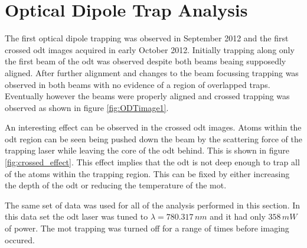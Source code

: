 \section{Optical Dipole Trap Analysis}
The first optical dipole trapping was observed in September 2012 and the first crossed \gls{odt} images acquired in early October 2012. Initially trapping along only the first beam of the \gls{odt} was observed despite both beams beaing supposedly aligned. After further alignment and changes to the beam focussing trapping was observed in both beams with no evidence of a region of overlapped traps. Eventually however the beams were properly aligned and crossed trapping was observed as shown in figure \ref{fig:ODTimage1}.

An interesting effect can be observed in the crossed \gls{odt} images. Atoms within the \gls{odt} region can be seen being pushed down the beam by the scattering force of the trapping laser while leaving the core of the \gls{odt} behind. This is shown in figure \ref{fig:crossed_effect}. This effect implies that the \gls{odt} is not deep enough to trap all of the atoms within the trapping region. This can be fixed by either increasing the depth of the \gls{odt} or reducing the temperature of the \gls{mot}.

The same set of data was used for all of the analysis performed in this section. In this data set the \gls{odt} laser was tuned to $\lambda=780.317\,\unit{nm}$ and it had only $358\,\unit{mW}$ of power. The \gls{mot} trapping was turned off for a range of times before imaging occured.

